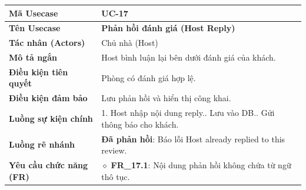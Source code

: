 \begin{table}[H]
\renewcommand{\arraystretch}{1.3}
\centering
\begin{tabularx}{\textwidth}{|p{4.5cm}|X|}
\hline
\cellcolor{gray!15}\bfseries Mã Usecase & \textbf{UC-17} \\ \hline
\cellcolor{gray!15}\bfseries Tên Usecase & \textbf{Phản hồi đánh giá (Host Reply)} \\ \hline
\cellcolor{gray!15}\bfseries Tác nhân (Actors) & Chủ nhà (Host) \\ \hline
\cellcolor{gray!15}\bfseries Mô tả ngắn & Host bình luận lại bên dưới đánh giá của khách. \\ \hline
\cellcolor{gray!15}\bfseries Điều kiện tiên quyết & Phòng có đánh giá hợp lệ. \\ \hline
\cellcolor{gray!15}\bfseries Điều kiện đảm bảo & Lưu phản hồi và hiển thị công khai. \\ \hline
\cellcolor{gray!15}\bfseries Luồng sự kiện chính & 1. Host nhập nội dung reply.\newline 2. Lưu vào DB.\newline 3. Gửi thông báo cho khách. \\ \hline
\cellcolor{gray!15}\bfseries Luồng rẽ nhánh & \textbf{Đã phản hồi}: Báo lỗi Host already replied to this review. \\ \hline
\cellcolor{gray!15}\bfseries Yêu cầu chức năng (FR) & $\diamond$ \textbf{FR\_17.1}: Nội dung phản hồi không chứa từ ngữ thô tục. \\ \hline
\end{tabularx}
\end{table}


